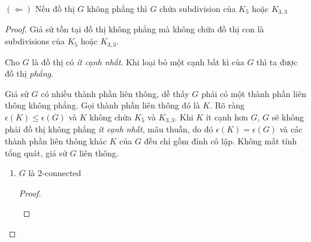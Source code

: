 $(\Leftarrow)$ Nếu đồ thị $G$ không phẳng thì $G$ chứa subdivision của $K_5$ hoặc $K_{3,3}$
\begin{proof}
    Giả sử tồn tại đồ thị không phẳng mà không chứa đồ thị con là subdivisions của $K_5$ hoặc $K_{3,3}$.

    Cho $G$ là đồ thị có \textit{ít cạnh nhất}. Khi loại bỏ một cạnh bất kì của $G$ thì ta được đồ thị \textit{phẳng}.

    Giả sử $G$ có nhiều thành phần liên thông, dễ thấy $G$ phải có một thành phần liên thông không phẳng. Gọi thành phần liên thông đó là $K$.
    Rõ ràng $\epsilon(K) \leq \epsilon(G)$ và $K$ không chứa $K_5$ và $K_{3,3}$. Khi $K$ ít cạnh hơn $G$, $G$ sẽ không phải đồ thị không phẳng \textit{ít cạnh nhất}, mâu thuẫn, do đó $\epsilon(K) = \epsilon(G)$
    và các thành phần liên thông khác $K$ của $G$ đều chỉ gồm đỉnh cô lập. Không mất tính tổng quát, giả sử $G$ liên thông.

    \begin{enumerate}
        \item $G$ là 2-connected
              \begin{proof}
                  \begin{figure}[H]
                      \centering
                  \end{figure}


\end{proof}
\end{enumerate}
\end{proof}
